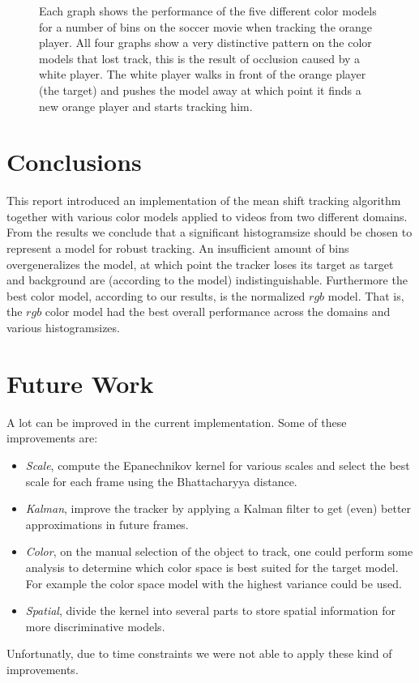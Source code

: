 \documentclass[11pt]{article}
\begin{document}
\begin{figure}[!ht]
{\label{fig:3d}
}
\caption{Each graph shows the performance of the five different color models
for a number of bins on the soccer movie when tracking the orange player. All
four graphs show a very distinctive pattern on the color models that lost
track, this is the result of occlusion caused by a white player. The white
player walks in front of the orange player (the target) and pushes the model
away at which point it finds a new orange player and starts tracking him.}
\label{fig:soccer}
\end{figure}

\section{Conclusions} \label{sec:conclusion}
This report introduced an implementation of the mean shift tracking algorithm
together with various color models applied to videos from two different domains.
From the results we conclude that a significant histogramsize should be chosen
to represent a model for robust tracking. An insufficient amount of bins
overgeneralizes the model, at which point the tracker loses its target as
target and background are (according to the model) indistinguishable.
Furthermore the best color model, according to our results, is the normalized
$rgb$ model. That is, the $rgb$ color model had the best overall performance
across the domains and various histogramsizes.

\newpage
\section{Future Work} \label{sec:future}
A lot can be improved in the current implementation. Some of these improvements
are:
\begin{itemize}
\item{\emph{Scale}, compute the Epanechnikov kernel for various scales and
select the best scale for each frame using the Bhattacharyya distance.}
\item{\emph{Kalman}, improve the tracker by applying a Kalman filter to get
(even) better approximations in future frames.}
\item{\emph{Color}, on the manual selection of the object to track, one could
perform some analysis to determine which color space is best suited for the
target model. For example the color space model with the highest variance could
be used.}
\item{\emph{Spatial}, divide the kernel into several parts to store spatial
information for more discriminative models.}
\end{itemize}
Unfortunatly, due to time constraints we were not able to apply these kind of
improvements.

\renewcommand\bibname{References}


\end{document}
